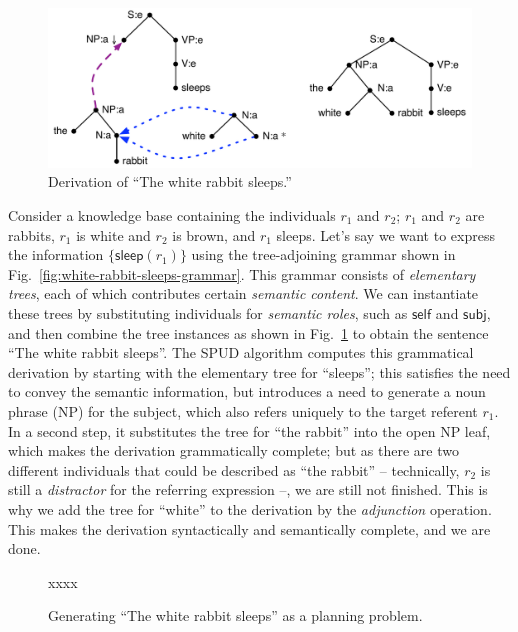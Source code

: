 \begin{figure}
  \centering
  \includegraphics[width=\columnwidth]{pic-derivation}
  \caption{Derivation of ``The white rabbit sleeps.''}
  \label{fig:white-rabbit-sleeps-deriv}
\end{figure}

Consider a knowledge base containing the individuals $r_1$ and $r_2$;
$r_1$ and $r_2$ are rabbits, $r_1$ is white and $r_2$ is brown, and
$r_1$ sleeps.  Let's say we want to express the information
$\{\mathsf{sleep}(r_1)\}$ using the tree-adjoining grammar shown in
Fig.~\ref{fig:white-rabbit-sleeps-grammar}.  This grammar consists of
\emph{elementary trees}, each of which contributes certain
\emph{semantic content}.  We can instantiate these trees by
substituting individuals for \emph{semantic roles}, such as
$\mathsf{self}$ and $\mathsf{subj}$, and then combine the tree
instances as shown in Fig.~\ref{fig:white-rabbit-sleeps-deriv} to
obtain the sentence ``The white rabbit sleeps''.  The SPUD algorithm
computes this grammatical derivation by starting with the elementary
tree for ``sleeps''; this satisfies the need to convey the semantic
information, but introduces a need to generate a noun phrase (NP) for
the subject, which also refers uniquely to the target referent $r_1$.
In a second step, it substitutes the tree for ``the rabbit'' into the
open NP leaf, which makes the derivation grammatically complete; but
as there are two different individuals that could be described as
``the rabbit'' -- technically, $r_2$ is still a \emph{distractor} for
the referring expression --, we are still not finished.  This is why
we add the tree for ``white'' to the derivation by the
\emph{adjunction} operation.  This makes the derivation syntactically
and semantically complete, and we are done.

\begin{figure}
  \centering
  xxxx
  \caption{Generating ``The white rabbit sleeps'' as a planning problem.}
  \label{fig:white-rabbit-as-planning}
\end{figure}

